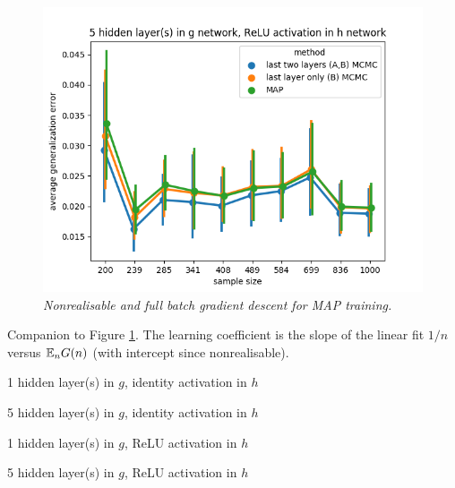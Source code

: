\documentclass{article} %
\begin{document}
\begin{figure}[t!]
\begin{center}
		\includegraphics[scale=0.35]{taskid3.png}
	\end{center}
	\caption{\textit{Nonrealisable and full batch gradient descent for MAP training.}}
	\label{fig:avg_gen_err_fullbatch_nonrealisable}
\end{figure}


\begin{table}[h!]%
	\centering
	\caption{Companion to Figure \ref{fig:avg_gen_err_fullbatch_nonrealisable}. The learning coefficient is the slope of the linear fit $1/n$ versus $\mathbb{E}_n G(n)$ (with intercept since nonrealisable).}%
	\label{table::avg_gen_err_fullbatch_nonrealisable}%
	\begin{tiny}
	\begin{subtable}[t]{2.5in}
		\caption{1 hidden layer(s) in $g$, identity activation in $h$}
		
	\end{subtable}
	\quad
	\begin{subtable}[t]{2.5in}
		\caption{5 hidden layer(s) in $g$, identity activation in $h$}		
	\end{subtable}
	\quad 
	\begin{subtable}[t]{2.5in}
		\caption{1 hidden layer(s) in $g$, ReLU activation in $h$}
		
	\end{subtable}
	\quad 
	\begin{subtable}[t]{2.5in}
		\caption{5 hidden layer(s) in $g$, ReLU activation in $h$}		
	\end{subtable}
	\end{tiny}
\end{table}
\end{document}
